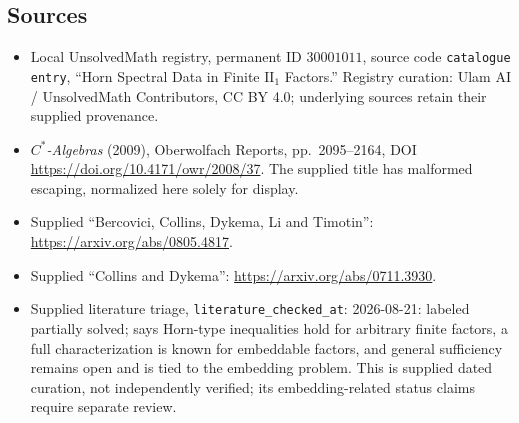 \documentclass[11pt]{article}
\begin{document}
\subsection{Sources}
\begin{itemize}
\item Local UnsolvedMath registry, permanent ID \(30001011\), source code \texttt{catalogue entry}, ``Horn Spectral Data in Finite \(\mathrm{II}_1\) Factors.'' Registry curation: Ulam AI / UnsolvedMath Contributors, CC BY 4.0; underlying sources retain their supplied provenance.
\item \emph{\(C^*\)-Algebras} (2009), Oberwolfach Reports, pp.\ 2095--2164, DOI \url{https://doi.org/10.4171/owr/2008/37}. The supplied title has malformed escaping, normalized here solely for display.
\item Supplied ``Bercovici, Collins, Dykema, Li and Timotin'': \url{https://arxiv.org/abs/0805.4817}.
\item Supplied ``Collins and Dykema'': \url{https://arxiv.org/abs/0711.3930}.
\item Supplied literature triage, \texttt{literature\_checked\_at}: 2026-08-21: labeled partially solved; says Horn-type inequalities hold for arbitrary finite factors, a full characterization is known for embeddable factors, and general sufficiency remains open and is tied to the embedding problem. This is supplied dated curation, not independently verified; its embedding-related status claims require separate review.
\end{itemize}
\end{document}
